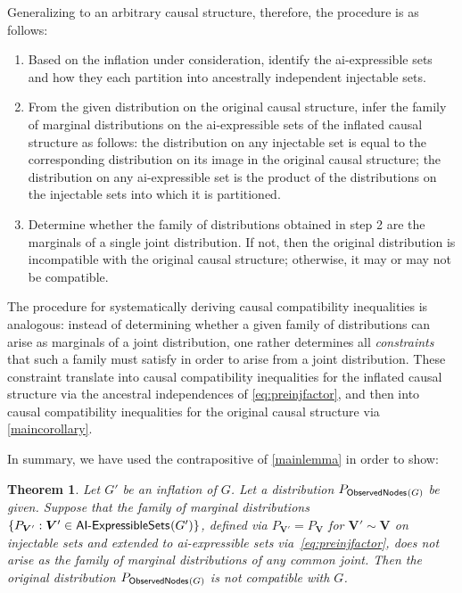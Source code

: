 \documentclass[aps,english,10pt,superscriptaddress,onecolumn,twoside,longbibliography,pra,floatfix,fleqn,nofootinbib]{revtex4-1}
\newtheorem{theorem}{Theorem}
\theoremstyle{definition}
\newcommand{\SmallNamedFunction}[3][]{\operatorname{\mathsf{#2}}_{#1}\parenths{#3}}
\newcommand{\obsnodes}[1]{\SmallNamedFunction{ObservedNodes}{#1}}
\DeclarePairedDelimiter{\parenths}{\lparen}{\rparen}
\newcommand{\tob}[1]{\textcolor{RawSienna}{#1}}
\begin{document}
Generalizing to an arbitrary causal structure, therefore, the procedure is as follows:
\begin{enumerate}
\item Based on the inflation under consideration, identify the ai-expressible sets and how they each partition into ancestrally independent injectable sets.
\item From the given distribution on the original causal structure, infer the family of marginal distributions on the ai-expressible sets of the inflated causal structure as follows: the distribution on any injectable set is equal to the corresponding distribution on its image in the original causal structure; the distribution on any ai-expressible set is the product of the distributions on the injectable sets into which it is partitioned.
\item Determine whether the family of distributions obtained in step 2 are the marginals of a single joint distribution. If not, then the original distribution is incompatible with the original causal structure; otherwise, it may or may not be compatible.
\end{enumerate}

The procedure for systematically deriving causal compatibility inequalities is analogous: instead of determining whether a given family of distributions can arise as marginals of a joint distribution, one rather determines all \emph{constraints} that such a family must satisfy in order to arise from a joint distribution. These constraint translate into causal compatibility inequalities for the inflated causal structure via the ancestral independences of \cref{eq:preinjfactor}, and then into causal compatibility inequalities for the original causal structure via \cref{maincorollary}.

\tob{In summary, we have used the contrapositive of \cref{mainlemma} in order to show:}

\begin{theorem}
\tob{Let $G'$ be an inflation of $G$. Let a distribution $P_{\obsnodes{G}}$ be given. Suppose that the family of marginal distributions $\{ P_{\bm{V}'} : \bm{V}' \in \SmallNamedFunction{AI-ExpressibleSets}{G'} \}$, defined via $P_{\bm{V}'}= P_{\bm{V}}$ for $\bm{V}' \sim \bm{V}$ on injectable sets and extended to ai-expressible sets via~\cref{eq:preinjfactor}, does not arise as the family of marginal distributions of any common joint. Then the original distribution $P_{\obsnodes{G}}$ is not compatible with $G$.}
\end{theorem}
\end{document}
